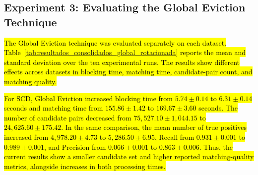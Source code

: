 \documentclass{ieeeaccess}
\begin{document}
\begin{table}[!t]
\centering
\caption{\hl{Unadjusted Mann--Whitney U $p$-values for comparisons between the Baseline and eviction techniques. Values below 0.05 are treated as statistically significant.}}
\label{tab:mann_whitney_pvalues}
\scriptsize
\setlength{\tabcolsep}{4pt}
\renewcommand{\arraystretch}{0.95}
\end{table}

\subsection{Experiment 3: Evaluating the Global Eviction Technique}
\hl{The Global Eviction technique was evaluated separately on each dataset. Table~\ref{tab:resultados_consolidados_global_rotacionada} reports the mean and standard deviation over the ten experimental runs. The results show different effects across datasets in blocking time, matching time, candidate-pair count, and matching quality.}

\hl{For SCD, Global Eviction increased blocking time from $5.74 \pm 0.14$ to $6.31 \pm 0.14$ seconds and matching time from $155.86 \pm 1.42$ to $169.67 \pm 3.60$ seconds. The number of candidate pairs decreased from $75{,}527.10 \pm 1{,}044.15$ to $24{,}625.60 \pm 175.42$. In the same comparison, the mean number of true positives increased from $4{,}978.20 \pm 4.73$ to $5{,}286.50 \pm 6.95$, Recall from $0.931 \pm 0.001$ to $0.989 \pm 0.001$, and Precision from $0.066 \pm 0.001$ to $0.863 \pm 0.006$. Thus, the current results show a smaller candidate set and higher reported matching-quality metrics, alongside increases in both processing times.}
\end{document}
